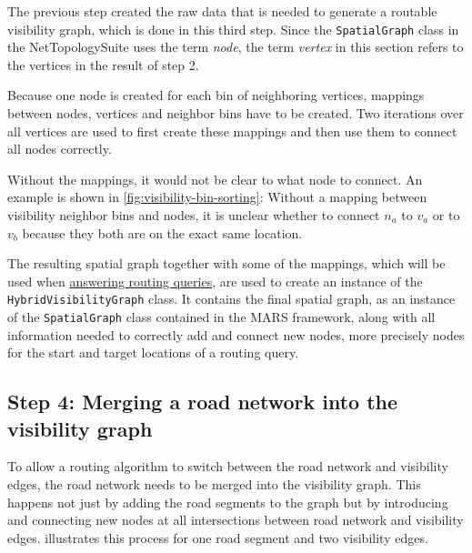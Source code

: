 		The previous step created the raw data that is needed to generate a routable visibility graph, which is done in this third step.
		Since the \texttt{SpatialGraph} class in the NetTopologySuite uses the term \emph{node}, the term \emph{vertex} in this section refers to the vertices in the result of step 2.
		
		Because one node is created for each bin of neighboring vertices, mappings between nodes, vertices and neighbor bins have to be created.
		Two iterations over all vertices are used to first create these mappings and then use them to connect all nodes correctly.
		
		Without the mappings, it would not be clear to what node to connect.
		An example is shown in \cref{fig:visibility-bin-sorting}:
		Without a mapping between visibility neighbor bins and nodes, it is unclear whether to connect $n_a$ to $v_a$ or to $v_b$ because they both are on the exact same location.
		
		The resulting spatial graph together with some of the mappings, which will be used when \hyperref[sec:answering-queries]{answering routing queries}, are used to create an instance of the \texttt{HybridVisibilityGraph} class.
		It contains the final spatial graph, as an instance of the \texttt{SpatialGraph} class contained in the MARS framework, along with all information needed to correctly add and connect new nodes, more precisely nodes for the start and target locations of a routing query.
		
	\subsection{Step 4: Merging a road network into the visibility graph}
	
		To allow a routing algorithm to switch between the road network and visibility edges, the road network needs to be merged into the visibility graph.
		This happens not just by adding the road segments to the graph but by introducing and connecting new nodes at all intersections between road network and visibility edges.
		 illustrates this process for one road segment and two visibility edges.
		
